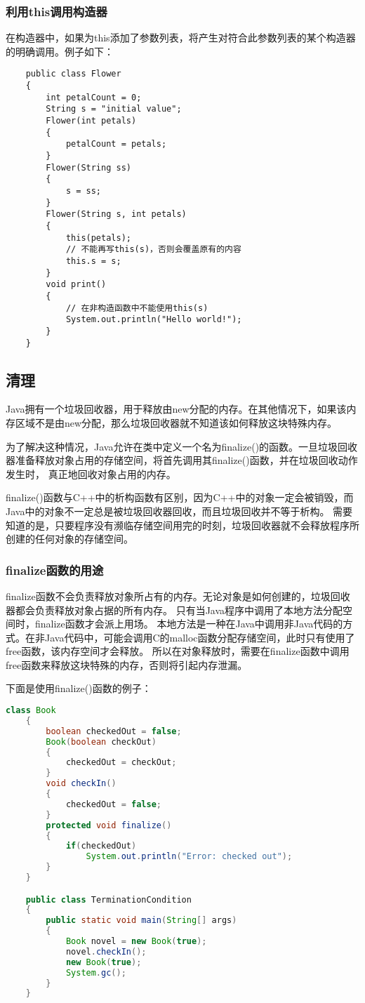 \documentclass[a4paper,left=2.5cm,right=2.5cm,11pt]{article}
\begin{document}
\subsubsection{利用this调用构造器}
	在构造器中，如果为this添加了参数列表，将产生对符合此参数列表的某个构造器的明确调用。例子如下：
	\begin{lstlisting}
	public class Flower
	{
		int petalCount = 0;
		String s = "initial value";
		Flower(int petals)
		{
			petalCount = petals;
		}
		Flower(String ss)
		{
			s = ss;
		}
		Flower(String s, int petals)
		{
			this(petals);
			// 不能再写this(s)，否则会覆盖原有的内容
			this.s = s;
		}
		void print()
		{
			// 在非构造函数中不能使用this(s)
			System.out.println("Hello world!");
		}
	}
	\end{lstlisting}

\subsection{清理}
	Java拥有一个垃圾回收器，用于释放由new分配的内存。在其他情况下，如果该内存区域不是由new分配，那么垃圾回收器就不知道该如何释放这块特殊内存。\par
	为了解决这种情况，Java允许在类中定义一个名为finalize()的函数。一旦垃圾回收器准备释放对象占用的存储空间，将首先调用其finalize()函数，并在垃圾回收动作发生时，
	真正地回收对象占用的内存。\par
	finalize()函数与C++中的析构函数有区别，因为C++中的对象一定会被销毁，而Java中的对象不一定总是被垃圾回收器回收，而且垃圾回收并不等于析构。
	需要知道的是，只要程序没有濒临存储空间用完的时刻，垃圾回收器就不会释放程序所创建的任何对象的存储空间。\par

\subsubsection{finalize函数的用途}
	finalize函数不会负责释放对象所占有的内存。无论对象是如何创建的，垃圾回收器都会负责释放对象占据的所有内存。
	只有当Java程序中调用了本地方法分配空间时，finalize函数才会派上用场。
	本地方法是一种在Java中调用非Java代码的方式。在非Java代码中，可能会调用C的malloc函数分配存储空间，此时只有使用了free函数，该内存空间才会释放。
	所以在对象释放时，需要在finalize函数中调用free函数来释放这块特殊的内存，否则将引起内存泄漏。\par

	下面是使用finalize()函数的例子：
	\begin{lstlisting}[language = Java]
	class Book
	{
		boolean checkedOut = false;
		Book(boolean checkOut)
		{
			checkedOut = checkOut;
		}
		void checkIn()
		{
			checkedOut = false;
		}
		protected void finalize()
		{
			if(checkedOut)
				System.out.println("Error: checked out");
		}
	}

	public class TerminationCondition
	{
		public static void main(String[] args)
		{
			Book novel = new Book(true);
			novel.checkIn();
			new Book(true);
			System.gc();
		}
	}
	\end{lstlisting}
\end{document}
